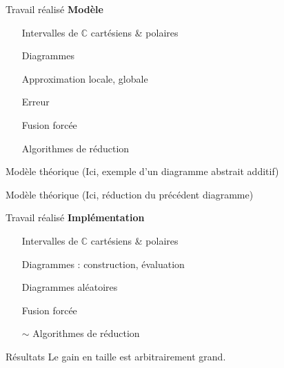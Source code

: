 \begin{frame}{Travail réalisé}
  \textbf{Modèle}
  \begin{itemize}
      \item[\checkmark] Intervalles de $\mathbb C$ cartésiens \& polaires
      \item[\checkmark] Diagrammes
      \item[\checkmark] Approximation locale, globale
      \item[\checkmark] Erreur
      \item[\checkmark] Fusion forcée
      \item[\checkmark] Algorithmes de réduction
  \end{itemize}
\end{frame}

\begin{frame}{Modèle théorique}
  \Huge{(Ici, exemple d'un diagramme abstrait additif)}
\end{frame}

\begin{frame}{Modèle théorique}
  \Huge{(Ici, réduction du précédent diagramme)}
\end{frame}

\begin{frame}{Travail réalisé}
  \textbf{Implémentation}
  \begin{itemize}
      \item[\checkmark] Intervalles de $\mathbb C$ cartésiens \& polaires
      \item[\checkmark] Diagrammes : construction, évaluation
      \item[\checkmark] Diagrammes aléatoires
      \item[\checkmark] Fusion forcée
      \item[$\sim$] Algorithmes de réduction
  \end{itemize}
\end{frame}

\begin{frame}{Résultats}
  Le gain en taille est arbitrairement grand.
\end{frame}

